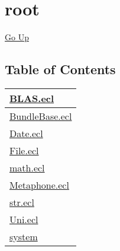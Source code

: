 \chapter*{\color{headtoc} root}
\hypertarget{ecldoc:toc:root}{}
\hyperlink{ecldoc:toc:}{Go Up}


\section*{Table of Contents}
{\renewcommand{\arraystretch}{1.5}
\begin{longtable}{|p{\textwidth}|}
\hline
\hyperlink{ecldoc:toc:BLAS}{BLAS.ecl} \\
\hline
\hyperlink{ecldoc:toc:BundleBase}{BundleBase.ecl} \\
\hline
\hyperlink{ecldoc:toc:Date}{Date.ecl} \\
\hline
\hyperlink{ecldoc:toc:File}{File.ecl} \\
\hline
\hyperlink{ecldoc:toc:math}{math.ecl} \\
\hline
\hyperlink{ecldoc:toc:Metaphone}{Metaphone.ecl} \\
\hline
\hyperlink{ecldoc:toc:str}{str.ecl} \\
\hline
\hyperlink{ecldoc:toc:Uni}{Uni.ecl} \\
\hline
\hyperlink{ecldoc:toc:root/system}{system} \\
\hline
\end{longtable}
}










